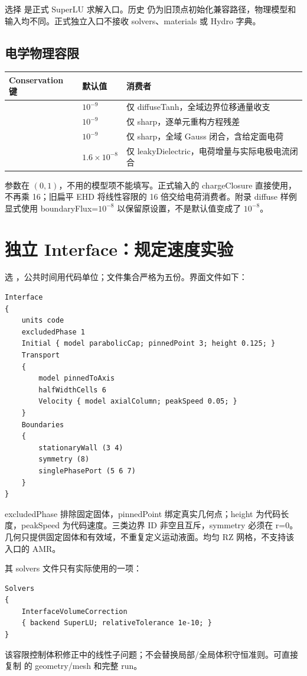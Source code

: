 \documentclass[a4paper,11pt]{article}
\begin{document}
选择  是正式 SuperLU 求解入口。历史  仍为旧顶点初始化兼容路径，物理模型和输入均不同。正式独立入口不接收 solvers、materials 或 Hydro 字典。

\subsection{电学物理容限}
\begin{longtable}{L{.29\linewidth}L{.16\linewidth}L{.47\linewidth}}
\toprule Conservation 键 & 默认值 & 消费者 \\\midrule\endhead
{} & $10^{-9}$ & 仅 diffuseTanh，全域边界位移通量收支 \\
 & $10^{-9}$ & 仅 sharp，逐单元重构方程残差 \\
 & $10^{-9}$ & 仅 sharp，全域 Gauss 闭合，含给定面电荷 \\
 & $1.6\times10^{-8}$ & 仅 leakyDielectric，电荷增量与实际电极电流闭合 \\
\bottomrule
\end{longtable}
参数在 $(0,1)$，不用的模型项不能填写。正式输入的 chargeClosure 直接使用，不再乘 16；旧扁平 EHD 将线性容限的 16 倍交给电荷消费者。附录 diffuse 样例显式使用 boundaryFlux=$10^{-8}$ 以保留原设置，不是默认值变成了 $10^{-8}$。

\section{独立 Interface：规定速度实验}
选 ，公共时间用代码单位；文件集合严格为五份。界面文件如下：
\begin{lstlisting}
Interface
{
    units code
    excludedPhase 1
    Initial { model parabolicCap; pinnedPoint 3; height 0.125; }
    Transport
    {
        model pinnedToAxis
        halfWidthCells 6
        Velocity { model axialColumn; peakSpeed 0.05; }
    }
    Boundaries
    {
        stationaryWall (3 4)
        symmetry (8)
        singlePhasePort (5 6 7)
    }
}
\end{lstlisting}
excludedPhase 排除固定固体，pinnedPoint 绑定真实几何点；height 为代码长度，peakSpeed 为代码速度。三类边界 ID 非空且互斥，symmetry 必须在 r=0。几何只提供固定固体和有效域，不重复定义运动液面。均匀 RZ 网格，不支持该入口的 AMR。

其 solvers 文件只有实际使用的一项：
\begin{lstlisting}
Solvers
{
    InterfaceVolumeCorrection
    { backend SuperLU; relativeTolerance 1e-10; }
}
\end{lstlisting}
该容限控制体积修正中的线性子问题；不会替换局部/全局体积守恒准则。可直接复制  的 geometry/mesh 和完整 run。
\end{document}
